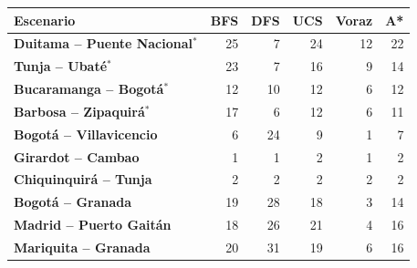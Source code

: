 \renewcommand{\arraystretch}{1.2}
\begin{tabular}{|l|r|r|r|r|r|}
\hline
\rowcolor{gray!20} \textbf{Escenario} & \textbf{BFS} & \textbf{DFS} & \textbf{UCS} & \textbf{Voraz} & \textbf{A*} \\
\hline
\textbf{Duitama -- Puente Nacional$^{*}$} & 25 & 7 & 24 & 12 & 22 \\
\hline
\textbf{Tunja -- Ubaté$^{*}$} & 23 & 7 & 16 & 9 & 14 \\
\hline
\textbf{Bucaramanga -- Bogotá$^{*}$} & 12 & 10 & 12 & 6 & 12 \\
\hline
\textbf{Barbosa -- Zipaquirá$^{*}$} & 17 & 6 & 12 & 6 & 11 \\
\hline
\textbf{Bogotá -- Villavicencio} & 6 & 24 & 9 & 1 & 7 \\
\hline
\textbf{Girardot -- Cambao} & 1 & 1 & 2 & 1 & 2 \\
\hline
\textbf{Chiquinquirá -- Tunja} & 2 & 2 & 2 & 2 & 2 \\
\hline
\textbf{Bogotá -- Granada} & 19 & 28 & 18 & 3 & 14 \\
\hline
\textbf{Madrid -- Puerto Gaitán} & 18 & 26 & 21 & 4 & 16 \\
\hline
\textbf{Mariquita -- Granada} & 20 & 31 & 19 & 6 & 16 \\
\hline
\end{tabular}
